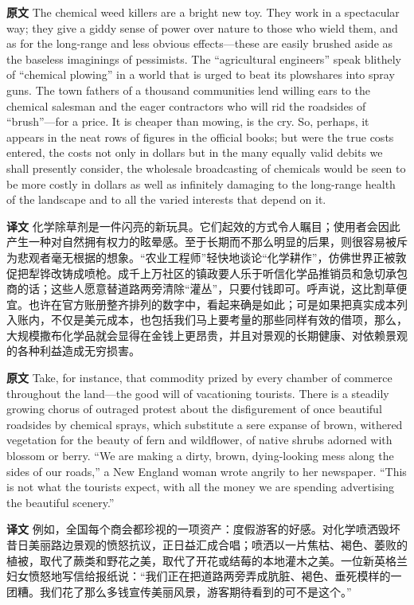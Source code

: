 \documentclass[UTF8,zihao=-4]{ctexart}
\begin{document}
\noindent\textbf{原文} The chemical weed killers are a bright new toy. They work in a spectacular way; they give a giddy sense of power over nature to those who wield them, and as for the long-range and less obvious effects---these are easily brushed aside as the baseless imaginings of pessimists. The ``agricultural engineers'' speak blithely of ``chemical plowing'' in a world that is urged to beat its plowshares into spray guns. The town fathers of a thousand communities lend willing ears to the chemical salesman and the eager contractors who will rid the roadsides of ``brush''---for a price. It is cheaper than mowing, is the cry. So, perhaps, it appears in the neat rows of figures in the official books; but were the true costs entered, the costs not only in dollars but in the many equally valid debits we shall presently consider, the wholesale broadcasting of chemicals would be seen to be more costly in dollars as well as infinitely damaging to the long-range health of the landscape and to all the varied interests that depend on it.
\par
\noindent\textbf{译文} 化学除草剂是一件闪亮的新玩具。它们起效的方式令人瞩目；使用者会因此产生一种对自然拥有权力的眩晕感。至于长期而不那么明显的后果，则很容易被斥为悲观者毫无根据的想象。“农业工程师”轻快地谈论“化学耕作”，仿佛世界正被敦促把犁铧改铸成喷枪。成千上万社区的镇政要人乐于听信化学品推销员和急切承包商的话；这些人愿意替道路两旁清除“灌丛”，只要付钱即可。呼声说，这比割草便宜。也许在官方账册整齐排列的数字中，看起来确是如此；可是如果把真实成本列入账内，不仅是美元成本，也包括我们马上要考量的那些同样有效的借项，那么，大规模撒布化学品就会显得在金钱上更昂贵，并且对景观的长期健康、对依赖景观的各种利益造成无穷损害。
\par\medskip

\noindent\textbf{原文} Take, for instance, that commodity prized by every chamber of commerce throughout the land---the good will of vacationing tourists. There is a steadily growing chorus of outraged protest about the disfigurement of once beautiful roadsides by chemical sprays, which substitute a sere expanse of brown, withered vegetation for the beauty of fern and wildflower, of native shrubs adorned with blossom or berry. ``We are making a dirty, brown, dying-looking mess along the sides of our roads,'' a New England woman wrote angrily to her newspaper. ``This is not what the tourists expect, with all the money we are spending advertising the beautiful scenery.''
\par
\noindent\textbf{译文} 例如，全国每个商会都珍视的一项资产：度假游客的好感。对化学喷洒毁坏昔日美丽路边景观的愤怒抗议，正日益汇成合唱；喷洒以一片焦枯、褐色、萎败的植被，取代了蕨类和野花之美，取代了开花或结莓的本地灌木之美。一位新英格兰妇女愤怒地写信给报纸说：“我们正在把道路两旁弄成肮脏、褐色、垂死模样的一团糟。我们花了那么多钱宣传美丽风景，游客期待看到的可不是这个。”
\par\medskip
\end{document}
